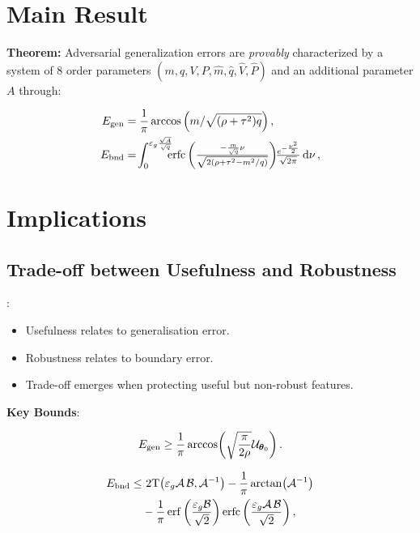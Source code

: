 \documentclass[a0paper,fleqn]{betterportraitposter}
\theoremstyle{plain}
\theoremstyle{definition}
\theoremstyle{remark}
\begin{document}
{\begin{multicols}{3}
\section{Main Result}

\textbf{Theorem:} Adversarial generalization errors are \textit{provably} characterized by a system of 8 order parameters $(m, q, V, P, \hat{m}, \hat{q}, \hat{V}, \hat{P})$ and an additional parameter \(A\) through:

\begin{align}
    E_{\mathrm{gen}} &= \frac{1}{\pi} \arccos \qty( 
    {
        m / \sqrt{ (\rho + \tau^2) q}
    } 
    ) \,, \\
    E_{\mathrm{bnd}} &= \!
    \int_{0}^{\varepsilon_g \frac{\sqrt{A}}{\sqrt{q}}} \!\!\!\!
    {\textstyle
        \operatorname*{erfc}\left( \frac{ -\frac{m}{\sqrt{q}} \nu}{\sqrt{2 \qty(\rho + \tau^2 - m^2 / q)}} \right) 
        \!\! \frac{e^{-\frac{\nu^2}{2}}}{\sqrt{2\pi}} \dd{\nu}
    }
    \label{eq:adv-error-theorem-overlap} \,, 
\end{align}


\section{Implications}

\subsection{Trade-off between Usefulness and Robustness}:

\begin{itemize}
    \item Usefulness relates to generalisation error.
    \item Robustness relates to boundary error.
    \item Trade-off emerges when protecting useful but non-robust features.
\end{itemize}

\textbf{Key Bounds}:

\begin{equation}\label{eq:bound-gen-error}
    E_{\mathrm{gen}}
    \geq
    \frac{1}{\pi} \arccos( \sqrt{\frac{\pi}{2 \rho}} \mathcal{U}_{\boldsymbol{\theta}_0} ) \,. 
\end{equation}

\begin{align} \label{eq:bound-boundary-error}
    \bounderr \leq & \  
    2 \mathrm{T}\qty( \advgencost \mathcal{A} \, \mathcal{B}, \mathcal{A}^{-1} ) - \frac{1}{\pi} \arctan( \mathcal{A}^{-1} ) \nonumber\\ 
    & - \frac{1}{\pi} \erf\qty( \frac{\advgencost \mathcal{B}}{\sqrt{2}} ) \erfc\qty( \frac{\advgencost \mathcal{A} \, \mathcal{B}}{\sqrt{2}} ) \,,
\end{align}




\end{multicols}}
\end{document}
